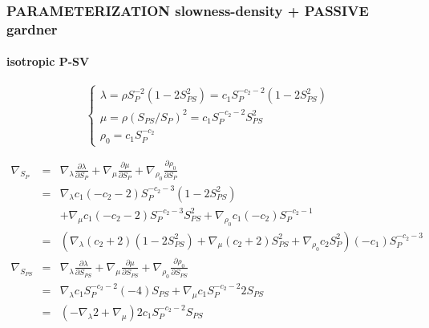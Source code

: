\documentclass[9pt]{beamer}
\newcommand{\partderi}[2]{\frac{\partial#1}{\partial#2}}
\begin{document}
\begin{frame}\frametitle{PARAMETERIZATION slowness-density  + PASSIVE gardner}
\framesubtitle{isotropic P-SV}

  \begin{center}
  \end{center}
  
  \[\left\{ \begin{array}{l}
    \lambda = \rho S_P^{-2} (1-2S_{PS}^2) = c_1 S_P^{-c_2-2} (1-2S_{PS}^2) \\
    \mu    = \rho (S_{PS}/S_P)^2 = c_1 S_P^{-c_2-2} S_{PS}^2\\
    \rho_0 = c_1 S_P^{-c_2}
  \end{array} \right.\]
  
  \begin{eqnarray}
    \nabla_{S_P} &=& \nabla_\lambda \partderi{\lambda}{S_P} + \nabla_\mu \partderi{\mu}{S_P} + \nabla_{\rho_0} \partderi{\rho_0}{S_P} \nonumber\\
		 &=& \nabla_\lambda c_1(-c_2-2)S_P^{-c_2-3}(1-2S_{PS}^2) \nonumber\\
		 & &+\nabla_\mu c_1(-c_2-2) S_P^{-c_2-3}S_{PS}^2 + \nabla_{\rho_0} c_1(-c_2)S_P^{-c_2-1} \nonumber\\
		 &=& \left(\nabla_\lambda (c_2+2)(1-2S_{PS}^2) + \nabla_\mu (c_2+2)S_{PS}^2 + \nabla_{\rho_0} c_2S_P^2 \right) (-c_1) S_P^{-c_2-3} \nonumber\\
    \nabla_{S_{PS}} &=& \nabla_\lambda \partderi{\lambda}{S_{PS}} + \nabla_\mu \partderi{\mu}{S_{PS}} + \nabla_{\rho_0} \partderi{\rho_0}{S_{PS}} \nonumber\\
		    &=& \nabla_\lambda c_1 S_P^{-c_2-2} (-4)S_{PS} + \nabla_\mu c_1 S_P^{-c_2-2} 2S_{PS} \nonumber\\
		    &=& \left(-\nabla_\lambda 2 + \nabla_\mu \right) 2c_1S_P^{-c_2-2}S_{PS}\nonumber\\
  \end{eqnarray}

\end{frame}
\end{document}
